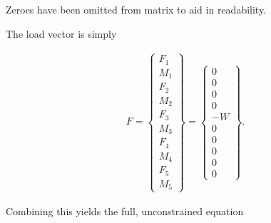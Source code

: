 \documentclass[10pt,letterpaper]{article}
\begin{document}
	Zeroes have been omitted from matrix to aid in readability.

	The load vector is simply

	\begin{align}
		{F} = 
		\begin{Bmatrix}
			F_1 \\
			M_1 \\
			F_2 \\
			M_2 \\
			F_3 \\
			M_3 \\
			F_4 \\
			M_4 \\
			F_5 \\
			M_5
		\end{Bmatrix} = 
		\begin{Bmatrix}
			0 \\
			0 \\
			0 \\
			0 \\
			-W \\
			0 \\
			0 \\
			0 \\
			0 \\
			0
		\end{Bmatrix} .
	\end{align}

	Combining this yields the full, unconstrained equation
\end{document}
